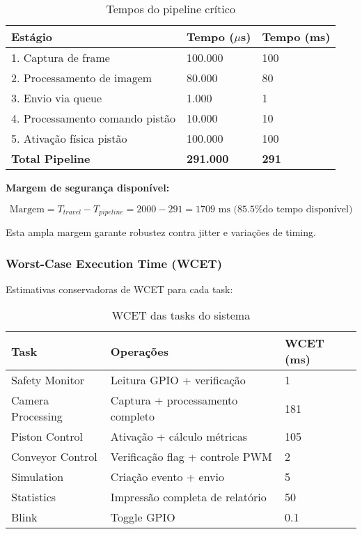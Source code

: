 \documentclass[12pt,a4paper]{article}
\begin{document}
\begin{table}[H]
\centering
\begin{tabularx}{\textwidth}{Xll}
\toprule
\textbf{Estágio} & \textbf{Tempo ($\mu$s)} & \textbf{Tempo (ms)} \\
\midrule
1. Captura de frame & 100.000 & 100 \\
2. Processamento de imagem & 80.000 & 80 \\
3. Envio via queue & 1.000 & 1 \\
4. Processamento comando pistão & 10.000 & 10 \\
5. Ativação física pistão & 100.000 & 100 \\
\midrule
\textbf{Total Pipeline} & \textbf{291.000} & \textbf{291} \\
\bottomrule
\end{tabularx}
\caption{Tempos do pipeline crítico}
\end{table}

\textbf{Margem de segurança disponível:}

\begin{equation}
\text{Margem} = T_{travel} - T_{pipeline} = 2000 - 291 = 1709 \text{ ms (85.5\% do tempo disponível)}
\end{equation}

Esta ampla margem garante robustez contra jitter e variações de timing.

\subsubsection{Worst-Case Execution Time (WCET)}

Estimativas conservadoras de WCET para cada task:

\begin{table}[H]
\centering
\begin{tabularx}{\textwidth}{lXl}
\toprule
\textbf{Task} & \textbf{Operações} & \textbf{WCET (ms)} \\
\midrule
Safety Monitor & Leitura GPIO + verificação & 1 \\
Camera Processing & Captura + processamento completo & 181 \\
Piston Control & Ativação + cálculo métricas & 105 \\
Conveyor Control & Verificação flag + controle PWM & 2 \\
Simulation & Criação evento + envio & 5 \\
Statistics & Impressão completa de relatório & 50 \\
Blink & Toggle GPIO & 0.1 \\
\bottomrule
\end{tabularx}
\caption{WCET das tasks do sistema}
\end{table}
\end{document}
